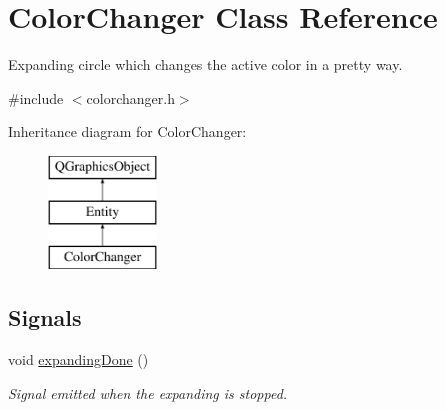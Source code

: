 \hypertarget{class_color_changer}{}\section{Color\+Changer Class Reference}
\label{class_color_changer}


Expanding circle which changes the active color in a pretty way.  




{\ttfamily \#include $<$colorchanger.\+h$>$}

Inheritance diagram for Color\+Changer\+:\begin{figure}[H]
\begin{center}
\leavevmode
\includegraphics[height=3.000000cm]{class_color_changer}
\end{center}
\end{figure}
\subsection*{Signals}
\begin{DoxyCompactItemize}
\item 
\mbox{\label{class_color_changer_afb1d640d1c2959456064663d41b9d83c}} 
void \hyperlink{class_color_changer_afb1d640d1c2959456064663d41b9d83c}{expanding\+Done} ()
\begin{DoxyCompactList}\small\item\em Signal emitted when the expanding is stopped. \end{DoxyCompactList}\end{DoxyCompactItemize}
